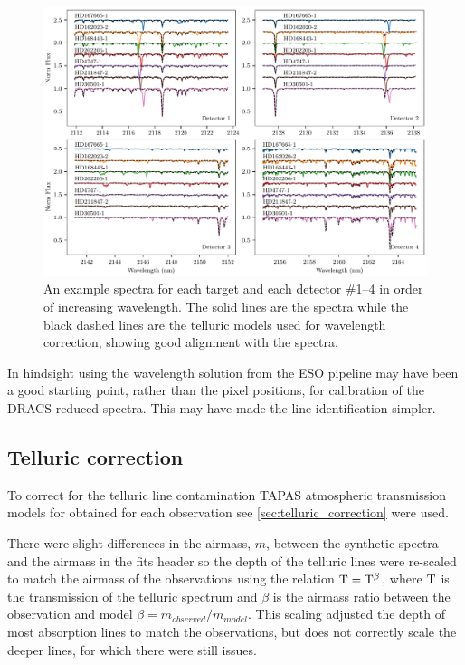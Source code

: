 \begin{figure}
    \centering
    \includegraphics[width=1\linewidth]{figures/reduction/Spectra_examples}
    \caption{An example spectra for each target and each detector \#1--4 in order of increasing wavelength.
The solid lines are the spectra while the black dashed lines are the telluric models used for wavelength correction, showing good alignment with the spectra.}
    \label{fig:spectraexamples}
\end{figure}




In hindsight using the wavelength solution from the {ESO} pipeline may have been a good starting point, rather than the pixel positions, for calibration of the {DRACS} reduced spectra.
This may have made the line identification simpler.


\subsection{Telluric correction}
\label{subsec:telluric_correction_application}

To correct for the telluric line contamination {TAPAS}\citep{bertaux_tapas_2014} atmospheric transmission models for obtained for each observation see \cref{sec:telluric_correction} were used.

There were slight differences in the airmass, $m$, between the synthetic spectra and the airmass in the fits header so the depth of the telluric lines were re-scaled to match the airmass of the observations using the relation \(\rm T = T^{\beta}\), where \(\rm T\) is the transmission of the telluric spectrum and \(\beta\) is the airmass ratio between the observation and model $\beta ={m_{observed}/m_{model}}$.
This scaling adjusted the depth of most absorption lines to match the observations, but does not correctly scale the deeper  lines, for which there were still issues.

